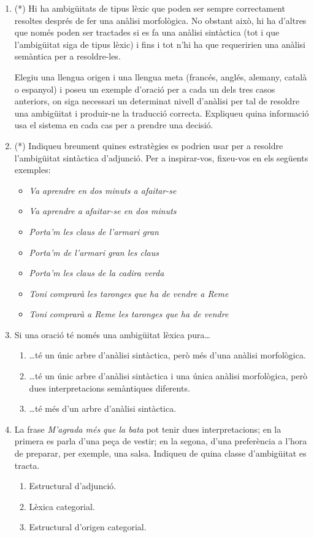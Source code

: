 \begin{enumerate}
\item (*) Hi ha ambigüitats de tipus lèxic que poden ser sempre
  correctament resoltes després de fer una anàlisi morfològica. No
  obstant això, hi ha d'altres que només poden ser tractades si es fa
  una anàlisi sintàctica (tot i que l'ambigüitat siga de tipus lèxic)
  i fins i tot n'hi ha que requeririen una anàlisi semàntica per a
  resoldre-les.
    
  Elegiu una llengua origen i una llengua meta (francés, anglés,
  alemany, català o espanyol) i poseu un exemple d'oració per a cada
  un dels tres casos anteriors, on siga necessari un determinat nivell
  d'anàlisi per tal de resoldre una ambigüitat i produir-ne la
  traducció correcta. Expliqueu quina informació usa el sistema en
  cada cas per a prendre una decisió.
      
\item (*) Indiqueu breument quines estratègies es podrien usar per a
  resoldre l'ambigüitat sintàctica d'adjunció.  Per a inspirar-vos,
  fixeu-vos en els següents exemples:
  \begin{itemize}
  \item \emph{Va aprendre en dos minuts a afaitar-se}
  \item \emph{Va aprendre a afaitar-se en dos minuts} 
  \item \emph{Porta'm les claus de l'armari gran}
  \item \emph{Porta'm de l'armari gran les claus}
  \item \emph{Porta'm les claus de la cadira verda}
  \item \emph{Toni comprarà les taronges que ha de vendre a Reme}
  \item \emph{Toni comprarà a Reme les taronges que ha de vendre} 
  \end{itemize}

\item Si una oració té només una ambigüitat lèxica pura\ldots
  \begin{enumerate}
  \item \ldots té un únic arbre d'anàlisi sintàctica, però més d'una
    anàlisi morfològica.
  \item \ldots té un únic arbre d'anàlisi sintàctica i una única
    anàlisi morfològica, però dues interpretacions se\-màn\-ti\-ques
    diferents.
  \item \ldots té més d'un arbre d'anàlisi sintàctica.
  \end{enumerate}

\item La frase \emph{M'agrada més que la bata} pot tenir dues
  interpretacions; en la primera es parla d'una peça de vestir; en la
  segona, d'una preferència a l'hora de preparar, per exemple, una
  salsa. Indiqueu de quina classe d'ambigüitat es tracta.
  \begin{enumerate}
  \item Estructural d'adjunció.
  \item Lèxica categorial.
  \item Estructural d'origen categorial.
  \end{enumerate}


\end{enumerate}
